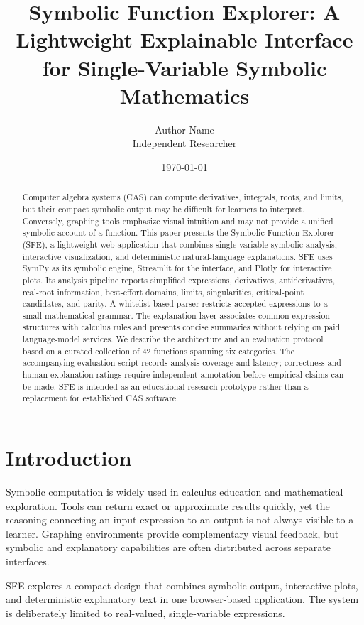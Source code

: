 \documentclass[11pt]{article}
\title{Symbolic Function Explorer: A Lightweight Explainable Interface for Single-Variable Symbolic Mathematics}
\author{Author Name\\Independent Researcher}
\date{\today}
\begin{document}
\maketitle

\begin{abstract}
Computer algebra systems (CAS) can compute derivatives, integrals, roots, and limits, but their compact symbolic output may be difficult for learners to interpret. Conversely, graphing tools emphasize visual intuition and may not provide a unified symbolic account of a function. This paper presents the Symbolic Function Explorer (SFE), a lightweight web application that combines single-variable symbolic analysis, interactive visualization, and deterministic natural-language explanations. SFE uses SymPy as its symbolic engine, Streamlit for the interface, and Plotly for interactive plots. Its analysis pipeline reports simplified expressions, derivatives, antiderivatives, real-root information, best-effort domains, limits, singularities, critical-point candidates, and parity. A whitelist-based parser restricts accepted expressions to a small mathematical grammar. The explanation layer associates common expression structures with calculus rules and presents concise summaries without relying on paid language-model services. We describe the architecture and an evaluation protocol based on a curated collection of 42 functions spanning six categories. The accompanying evaluation script records analysis coverage and latency; correctness and human explanation ratings require independent annotation before empirical claims can be made. SFE is intended as an educational research prototype rather than a replacement for established CAS software.
\end{abstract}

\section{Introduction}
Symbolic computation is widely used in calculus education and mathematical exploration. Tools can return exact or approximate results quickly, yet the reasoning connecting an input expression to an output is not always visible to a learner. Graphing environments provide complementary visual feedback, but symbolic and explanatory capabilities are often distributed across separate interfaces.

SFE explores a compact design that combines symbolic output, interactive plots, and deterministic explanatory text in one browser-based application. The system is deliberately limited to real-valued, single-variable expressions.
\end{document}
